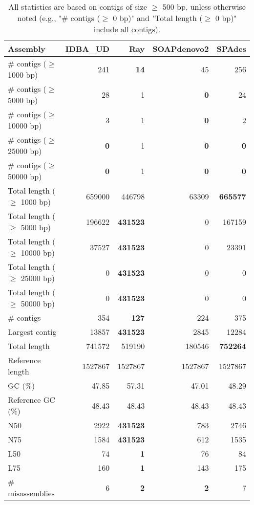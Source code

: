 \documentclass[12pt,a4paper]{article}
\begin{document}
\begin{table}[ht]
\begin{center}
\caption{All statistics are based on contigs of size $\geq$ 500 bp, unless otherwise noted (e.g., "\# contigs ($\geq$ 0 bp)" and "Total length ($\geq$ 0 bp)" include all contigs).}
\begin{tabular}{|l*{4}{|r}|}
\hline
Assembly & IDBA\_UD & Ray & SOAPdenovo2 & SPAdes \\ \hline
\# contigs ($\geq$ 1000 bp) & 241 & {\bf 14} & 45 & 256 \\ \hline
\# contigs ($\geq$ 5000 bp) & 28 & 1 & {\bf 0} & 24 \\ \hline
\# contigs ($\geq$ 10000 bp) & 3 & 1 & {\bf 0} & 2 \\ \hline
\# contigs ($\geq$ 25000 bp) & {\bf 0} & 1 & {\bf 0} & {\bf 0} \\ \hline
\# contigs ($\geq$ 50000 bp) & {\bf 0} & 1 & {\bf 0} & {\bf 0} \\ \hline
Total length ($\geq$ 1000 bp) & 659000 & 446798 & 63309 & {\bf 665577} \\ \hline
Total length ($\geq$ 5000 bp) & 196622 & {\bf 431523} & 0 & 167159 \\ \hline
Total length ($\geq$ 10000 bp) & 37527 & {\bf 431523} & 0 & 23391 \\ \hline
Total length ($\geq$ 25000 bp) & 0 & {\bf 431523} & 0 & 0 \\ \hline
Total length ($\geq$ 50000 bp) & 0 & {\bf 431523} & 0 & 0 \\ \hline
\# contigs & 354 & {\bf 127} & 224 & 375 \\ \hline
Largest contig & 13857 & {\bf 431523} & 2845 & 12284 \\ \hline
Total length & 741572 & 519190 & 180546 & {\bf 752264} \\ \hline
Reference length & 1527867 & 1527867 & 1527867 & 1527867 \\ \hline
GC (\%) & 47.85 & 57.31 & 47.01 & 48.29 \\ \hline
Reference GC (\%) & 48.43 & 48.43 & 48.43 & 48.43 \\ \hline
N50 & 2922 & {\bf 431523} & 783 & 2746 \\ \hline
N75 & 1584 & {\bf 431523} & 612 & 1535 \\ \hline
L50 & 74 & {\bf 1} & 76 & 84 \\ \hline
L75 & 160 & {\bf 1} & 143 & 175 \\ \hline
\# misassemblies & 6 & {\bf 2} & {\bf 2} & 7 \\ \hline

\end{tabular}
\end{center}
\end{table}
\end{document}
